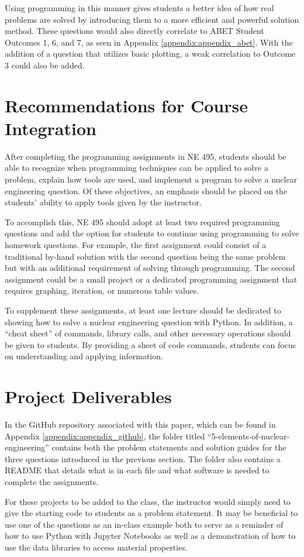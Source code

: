 Using programming in this manner gives students a better idea of how real problems are solved by
introducing them to a more efficient and powerful solution method. These questions would also 
directly correlate to ABET Student Outcomes 1, 6, and 7, as seen in Appendix 
\ref{appendix:appendix_abet}. With the addition of a question that utilizes basic plotting, a 
weak correlation to Outcome 3 could also be added.

\section{Recommendations for Course Integration}

After completing the programming assignments in NE 495, students should be able to recognize when programming
techniques can be applied to solve a problem, explain how tools are used, and implement a program to solve 
a nuclear engineering question. Of these objectives, an emphasis should be placed on the students' ability to apply
tools given by the instructor.

To accomplish this, NE 495 should adopt at least two required programming questions and add the option for 
students to continue using programming to solve homework questions. For example, the first assignment could
consist of a traditional by-hand solution with the second question being the same problem but with an additional
requirement of solving through programming. The second assignment could be a small project or a dedicated
programming assignment that requires graphing, iteration, or numerous table values. 

To supplement these assignments, at least one lecture should be dedicated to showing how to solve a nuclear 
engineering question with Python. In addition, a ``cheat sheet'' of commands, library calls, and other 
necessary operations should be given to students. By providing a sheet of code commands, students can focus 
on understanding and applying information.

\section{Project Deliverables}

In the GitHub repository associated with this paper, which can be found in 
Appendix \ref{appendix:appendix_github}, the folder titled ``5-elements-of-nuclear-engineering''
contains both the problem statements and solution guides for the three questions introduced in 
the previous section. The folder also contains a README that details what is in each file and 
what software is needed to complete the assignments. 

For these projects to be added to the class, the instructor would simply need to give the 
starting code to students as a problem statement. It may be beneficial to use one of the questions 
as an in-class example both to serve as a reminder of how to use Python with Jupyter Notebooks 
as well as a demonstration of how to use the data libraries to access material properties.